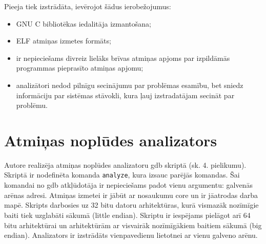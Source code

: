 Pieeja tiek izstrādāta, ievērojot šādus ierobežojumus: %
\begin{itemize}
	\item GNU C bibliotēkas iedalitāja izmantošana;
    \item ELF atmiņas izmetes formāts;
    \item ir nepieciešams divreiz lielāks brīvas atmiņas apjoms par izpildāmās programmas pieprasīto atmiņas apjomu;
    \item analizātori nedod pilnīgu secinājumu par problēmas esamību, bet sniedz informāciju par sistēmas stāvokli, kura ļauj izstradatājam secināt par problēmu.
\end{itemize}



\section{Atmiņas noplūdes analizators}
Autore realizēja atmiņas noplūdes analizatoru gdb skriptā (sk. 4. pielikumu). Skriptā ir nodefinēta komanda \texttt{analyze}, kura izsauc parējās komandas.
Šai komandai no gdb atkļūdotāja ir nepieciešams padot vienu argumentu: galvenās arēnas adresi.
Atmiņas izmetei ir jābūt ar nosaukumu core un ir jāatrodas darba mapē.
Skripts darbosies uz 32 bitu datoru arhitektūras, kurā vismazāk nozīmīgie baiti tiek uzglabāti sākumā (little endian).
Skriptu ir iespējams pielāgot arī 64 bitu arhitektūrai un arhitektūrām ar visvairāk nozīmīgākiem baitiem sākumā (big endian).
Analizators ir izstrādāts vienpavedienu lietotnei ar vienu galveno arēnu.

